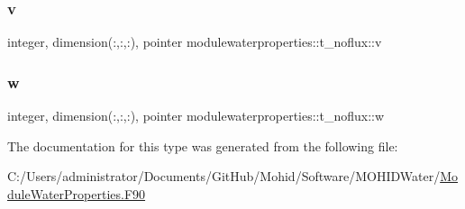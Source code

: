 \mbox{\label{structmodulewaterproperties_1_1t__noflux_a7c1e20f946683be36e8542e8c3335e9b}} 
\subsubsection{\texorpdfstring{v}{v}}
{\footnotesize\ttfamily integer, dimension(\+:,\+:,\+:), pointer modulewaterproperties\+::t\+\_\+noflux\+::v\hspace{0.3cm}{\ttfamily [private]}}

\mbox{\label{structmodulewaterproperties_1_1t__noflux_a8eeea2c57fb82146e5ee502428c8fe16}} 
\subsubsection{\texorpdfstring{w}{w}}
{\footnotesize\ttfamily integer, dimension(\+:,\+:,\+:), pointer modulewaterproperties\+::t\+\_\+noflux\+::w\hspace{0.3cm}{\ttfamily [private]}}



The documentation for this type was generated from the following file\+:\begin{DoxyCompactItemize}
\item 
C\+:/\+Users/administrator/\+Documents/\+Git\+Hub/\+Mohid/\+Software/\+M\+O\+H\+I\+D\+Water/\mbox{\hyperlink{_module_water_properties_8_f90}{Module\+Water\+Properties.\+F90}}\end{DoxyCompactItemize}
